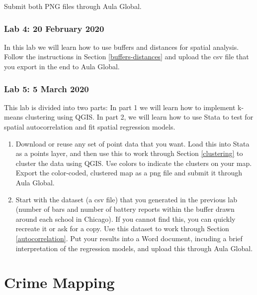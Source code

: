 \documentclass[]{book}
\begin{document}
Submit both PNG files through Aula Global.

\hypertarget{lab-4-20-february-2020}{%
\section*{Lab 4: 20 February 2020}\label{lab-4-20-february-2020}}

In this lab we will learn how to use buffers and distances for spatial analysis. Follow the instructions in Section \ref{buffers-distances} and upload the csv file that you export in the end to Aula Global.

\hypertarget{lab-5-5-march-2020}{%
\section*{Lab 5: 5 March 2020}\label{lab-5-5-march-2020}}

This lab is divided into two parts: In part 1 we will learn how to implement k-means clustering using QGIS. In part 2, we will learn how to use Stata to test for spatial autocorrelation and fit spatial regression models.

\begin{enumerate}
\def\labelenumi{\arabic{enumi}.}
\item
  Download or reuse any set of point data that you want. Load this into Stata as a points layer, and then use this to work through Section \ref{clustering} to cluster the data using QGIS. Use colors to indicate the clusters on your map. Export the color-coded, clustered map as a png file and submit it through Aula Global.
\item
  Start with the dataset (a csv file) that you generated in the previous lab (number of bars and number of battery reports within the buffer drawn around each school in Chicago). If you cannot find this, you can quickly recreate it or ask for a copy. Use this dataset to work through Section \ref{autocorrelation}. Put your results into a Word document, incuding a brief interpretation of the regression models, and upload this through Aula Global.
\end{enumerate}

\hypertarget{part-crime-mapping}{%
\part{Crime Mapping}\label{part-crime-mapping}}
\end{document}
